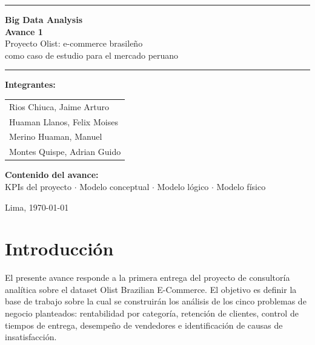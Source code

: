 \documentclass[11pt,a4paper]{article}
\begin{document}
\begin{titlepage}
\centering
\vspace*{2cm}

{\color{primario}\rule{\textwidth}{1.5pt}}
\vspace{0.8cm}

{\Large\bfseries Big Data Analysis}\\[0.5cm]
{\Huge\bfseries\color{primario} Avance 1}\\[0.5cm]
{\Large Proyecto Olist: e-commerce brasileño\\ como caso de estudio para el mercado peruano}

\vspace{0.5cm}
{\color{primario}\rule{\textwidth}{1.5pt}}

\vspace{2.5cm}
{\large\bfseries Integrantes:}\\[0.6cm]

\begin{tabular}{l}
Rios Chiuca, Jaime Arturo\\[0.2cm]
Huaman Llanos, Felix Moises\\[0.2cm]
Merino Huaman, Manuel\\[0.2cm]
Montes Quispe, Adrian Guido\\
\end{tabular}

\vfill

{\large\bfseries Contenido del avance:}\\[0.3cm]
{\large KPIs del proyecto $\cdot$ Modelo conceptual $\cdot$ Modelo lógico $\cdot$ Modelo físico}

\vspace{1cm}
{\large Lima, \today}
\end{titlepage}

\section*{Introducción}

El presente avance responde a la primera entrega del proyecto de consultoría analítica sobre el dataset Olist Brazilian E-Commerce. El objetivo es definir la base de trabajo sobre la cual se construirán los análisis de los cinco problemas de negocio planteados: rentabilidad por categoría, retención de clientes, control de tiempos de entrega, desempeño de vendedores e identificación de causas de insatisfacción.
\end{document}
